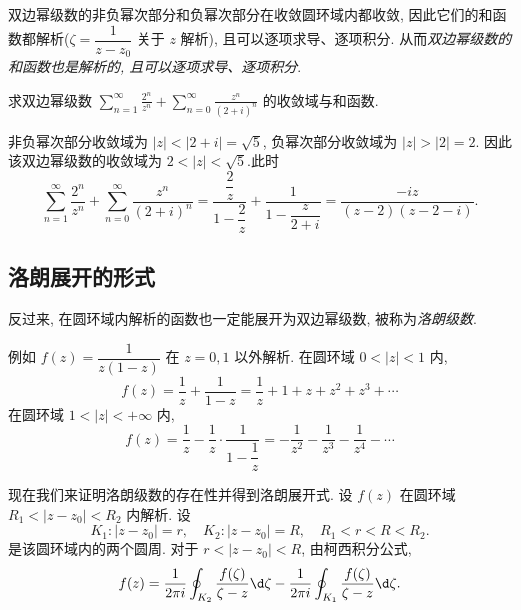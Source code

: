 双边幂级数的非负幂次部分和负幂次部分在收敛圆环域内都收敛,
因此它们的和函数都解析($\zeta=\dfrac1{z-z_0}$ 关于 $z$ 解析), 且可以逐项求导、逐项积分.
从而\emph{双边幂级数的和函数也是解析的, 且可以逐项求导、逐项积分}.

\begin{example}
	求双边幂级数 $\displaystyle\sum_{n=1}^\infty\frac{2^n}{z^n}+\sum_{n=0}^\infty\frac{z^n}{(2+i)^n}$ 的收敛域与和函数.
\end{example}

\begin{solution}
	非负幂次部分收敛域为 $|z|<|2+i|=\sqrt5$, 负幂次部分收敛域为 $|z|>|2|=2$.
	{因此该双边幂级数的收敛域为 $2<|z|<\sqrt5$.此时
		\[\sum_{n=1}^\infty\frac{2^n}{z^n}+\sum_{n=0}^\infty\frac{z^n}{(2+i)^n}
		=\frac{\dfrac 2z}{1-\dfrac 2z}+\frac1{1-\dfrac z{2+i}}
		=\frac{-iz}{(z-2)(z-2-i)}.\]}
\end{solution}

\subsection{洛朗展开的形式}

反过来, 在圆环域内解析的函数也一定能展开为双边幂级数, 被称为\emph{洛朗级数}.

例如 $f(z)=\dfrac1{z(1-z)}$ 在 $z=0,1$ 以外解析.
在圆环域 $0<|z|<1$ 内,
\[f(z)=\frac1z+\frac1{1-z}=\frac1z+1+z+z^2+z^3+\cdots\]
在圆环域 $1<|z|<+\infty$ 内,
\[f(z)=\frac1z-\frac1z\cdot\frac1{1-\dfrac1z}=-\frac1{z^2}-\frac1{z^3}-\frac1{z^4}-\cdots\]

现在我们来证明洛朗级数的存在性并得到洛朗展开式.
设 $f(z)$ 在圆环域 $R_1<|z-z_0|<R_2$ 内解析.
设
	\[K_1:|z-z_0|=r,\quad K_2:|z-z_0|=R,\quad R_1<r<R<R_2.\]
是该圆环域内的两个圆周. 
对于 $r<|z-z_0|<R$, 由柯西积分公式,
\[f(z)=\frac1{2\pi i}
	\oint_{K_2}\frac{f(\zeta)}{\zeta-z}\d\zeta
	-\frac1{2\pi i}\oint_{K_1}\frac{f(\zeta)}{\zeta-z}\d\zeta.\]

\begin{center}
\end{center}

